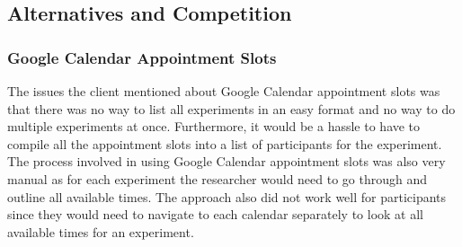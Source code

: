 \subsection{Alternatives and Competition}
\subsubsection{Google Calendar Appointment Slots}
The issues the client mentioned about Google Calendar appointment slots was that there was no way to list all experiments in an easy format and no way to do multiple experiments at once. Furthermore, it would be a hassle to have to compile all the appointment slots into a list of participants for the experiment. The process involved in using Google Calendar appointment slots was also very manual as for each experiment the researcher would need to go through and outline all available times. The approach also did not work well for participants since they would need to navigate to each calendar separately to look at all available times for an experiment.